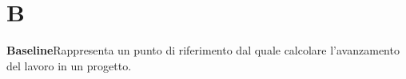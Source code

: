 \newpage
\section{B}\label{l:B}
\textbf{Baseline}\newline Rappresenta un punto di riferimento dal quale calcolare l'avanzamento del lavoro in un progetto.
